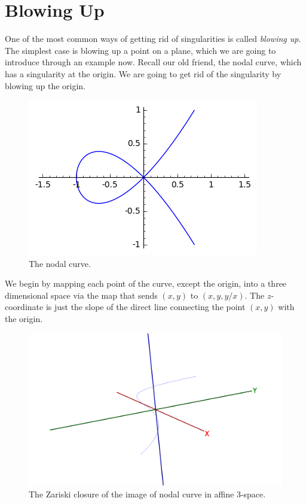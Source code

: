 \documentclass[12pt,a4paper,leqno]{article}
\theoremstyle{plain}
\theoremstyle{definition}
\theoremstyle{remark}
\begin{document}
\section{Blowing Up}\label{BlowUp}

One of the most common ways of getting rid of singularities is called \emph{blowing up}. The simplest case is blowing up a point on a plane, which we are going to introduce through an example now. Recall our old friend, the nodal curve, which has a singularity at the origin. We are going to get rid of the singularity by blowing up the origin.

\begin{figure}\label{node3}
\begin{center}
\includegraphics{pics/node.png}
\caption{The nodal curve.}
\end{center}
\end{figure}

We begin by mapping each point of the curve, except the origin, into a three dimensional space via the map that sends $(x,y)$ to $(x,y,y/x)$. The $z$-coordinate is just the slope of the direct line connecting the point $(x,y)$ with the origin.

\begin{figure}\label{blownUpNode}
\begin{center}
\includegraphics[scale=0.8]{pics/blown_up_node.png}
\caption{The Zariski closure of the image of nodal curve in affine 3-space.}
\end{center}
\end{figure}
\end{document}

